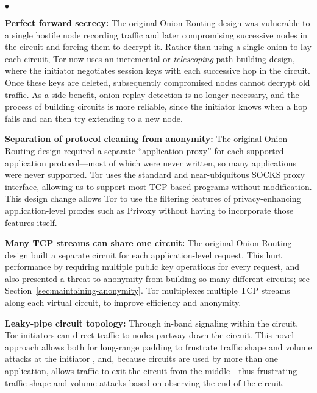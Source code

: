\documentclass[times,10pt,twocolumn]{article}
\newenvironment{tightlist}{\begin{list}{$\bullet$}{
  \setlength{\itemsep}{0mm}
    \setlength{\parsep}{0mm}
    }}{\end{list}}
\begin{document}
\begin{tightlist}

\item \textbf{Perfect forward secrecy:} The original Onion Routing
design was vulnerable to a single hostile node recording traffic and
later compromising successive nodes in the circuit and forcing them
to decrypt it.  Rather than using a single onion to lay each circuit,
Tor now uses an incremental or \emph{telescoping} path-building design,
where the initiator negotiates session keys with each successive hop in
the circuit.  Once these keys are deleted, subsequently compromised nodes
cannot decrypt old traffic.  As a side benefit, onion replay detection
is no longer necessary, and the process of building circuits is more
reliable, since the initiator knows when a hop fails and can then try
extending to a new node.

\item \textbf{Separation of protocol cleaning from anonymity:}
The original Onion Routing design required a separate ``application
proxy'' for each supported application protocol---most of which were
never written, so many applications were never supported.  Tor uses the
standard and near-ubiquitous SOCKS \cite{socks4} proxy interface, allowing
us to support most TCP-based programs without modification.  This design
change allows Tor to use the filtering features of privacy-enhancing
application-level proxies such as Privoxy \cite{privoxy} without having
to incorporate those features itself.

\item \textbf{Many TCP streams can share one circuit:} The
original Onion Routing design built a separate circuit for each
application-level request.  This hurt performance by requiring
multiple public key operations for every request, and also presented
a threat to anonymity from building so many different circuits; see
Section~\ref{sec:maintaining-anonymity}.  Tor multiplexes multiple TCP
streams along each virtual circuit, to improve efficiency and anonymity.

\item \textbf{Leaky-pipe circuit topology:} Through in-band signaling
within the circuit, Tor initiators can direct traffic to nodes partway
down the circuit. This novel approach allows both for long-range
padding to frustrate traffic shape and volume attacks at the initiator
\cite{defensive-dropping}, and, because circuits are used by more than one
application, allows traffic to exit the circuit from the middle---thus
frustrating traffic shape and volume attacks based on observing the end
of the circuit.


\end{tightlist}
\end{document}
